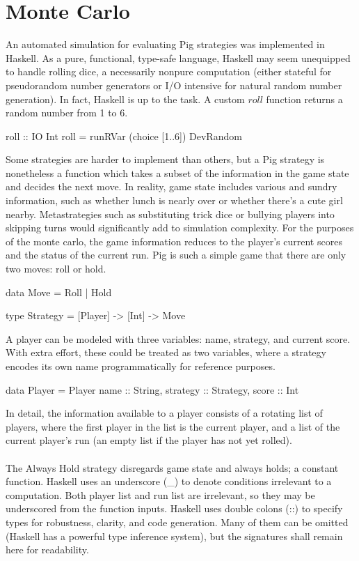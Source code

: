 \documentclass{article}
\begin{document}
\section*{Monte Carlo}
An automated simulation for evaluating Pig strategies was implemented in Haskell. As a pure, functional, type-safe language, Haskell may seem unequipped to handle rolling dice, a necessarily nonpure computation (either stateful for pseudorandom number generators or I/O intensive for natural random number generation). In fact, Haskell is up to the task. A custom $roll$ function returns a random number from 1 to 6.
\begin{verbatimtab}
roll :: IO Int
roll = runRVar (choice [1..6]) DevRandom
\end{verbatimtab}
Some strategies are harder to implement than others, but a Pig strategy is nonetheless a function which takes a subset of the information in the game state and decides the next move. In reality, game state includes various and sundry information, such as whether lunch is nearly over or whether there's a cute girl nearby. Metastrategies such as substituting trick dice or bullying players into skipping turns would significantly add to simulation complexity. For the purposes of the monte carlo, the game information reduces to the player's current scores and the status of the current run. Pig is such a simple game that there are only two moves: roll or hold.
\begin{verbatimtab}
data Move = Roll | Hold

type Strategy = [Player] -> [Int] -> Move
\end{verbatimtab}
A player can be modeled with three variables: name, strategy, and current score. With extra effort, these could be treated as two variables, where a strategy encodes its own name programmatically for reference purposes.
\begin{verbatimtab}
data Player = Player {
		name :: String,
		strategy :: Strategy,
		score :: Int
	}
\end{verbatimtab}
In detail, the information available to a player consists of a rotating list of players, where the first player in the list is the current player, and a list of the current player's run (an empty list if the player has not yet rolled).
\\\\
The Always Hold strategy disregards game state and always holds; a constant function. Haskell uses an underscore (\_) to denote conditions irrelevant to a computation. Both player list and run list are irrelevant, so they may be underscored from the function inputs. Haskell uses double colons (::) to specify types for robustness, clarity, and code generation. Many of them can be omitted (Haskell has a powerful type inference system), but the signatures shall remain here for readability.
\end{document}
